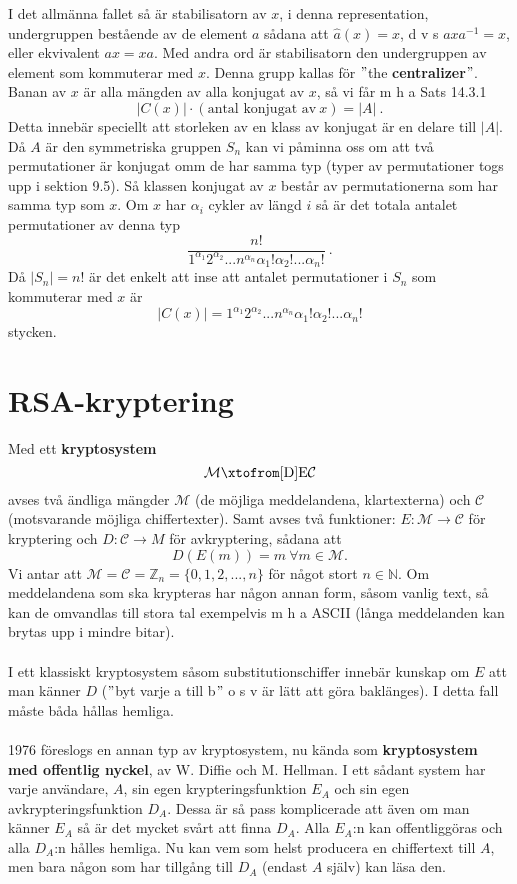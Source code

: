 \documentclass{article}
\begin{document}
I det allmänna fallet så är stabilisatorn av $x$, i denna representation, undergruppen bestående av de element $a$ sådana att $\hat{a}(x)=x$, d v s $axa^{-1}=x$, eller ekvivalent $ax=xa$. Med andra ord är stabilisatorn den undergruppen av element som kommuterar med $x$. Denna grupp kallas för $"$the \textbf{centralizer}$"$. Banan av $x$ är alla mängden av alla konjugat av $x$, så vi får m h a Sats 14.3.1
$$
|C(x)|\cdot(\textrm{antal konjugat av} \ x)=|A| \ .
$$
Detta innebär speciellt att storleken av en klass av konjugat är en delare till $|A|$. Då $A$ är den symmetriska gruppen $S_n$ kan vi påminna oss om att två permutationer är konjugat omm de har samma typ (typer av permutationer togs upp i sektion 9.5). Så klassen konjugat av $x$ består av permutationerna som har samma typ som $x$. Om $x$ har $\alpha_i$ cykler av längd $i$ så är det totala antalet permutationer av denna typ
$$
\frac{n!}{1^{\alpha_1}2^{\alpha_2}...n^{\alpha_n}\alpha_1!\alpha_2!...\alpha_n!} \ .
$$
Då $|S_n|=n!$ är det enkelt att inse att antalet permutationer i $S_n$ som kommuterar med $x$ är 
$$
|C(x)|=1^{\alpha_1}2^{\alpha_2}...n^{\alpha_n}\alpha_1!\alpha_2!...\alpha_n!
$$
stycken.
\newpage

\section{RSA-kryptering}
Med ett \textbf{kryptosystem}
$$
\mathcal{M}\xtofrom[\text{D}]{\text{E}}\mathcal{C}
$$
avses två ändliga mängder $\mathcal{M}$ (de möjliga meddelandena, klartexterna) och $\mathcal{C}$ (motsvarande möjliga chiffertexter). Samt avses två funktioner: $E:\mathcal{M}\rightarrow\mathcal{C}$ för kryptering och $D:\mathcal{C}\rightarrow{M}$ för avkryptering, sådana att
$$
D(E(m))=m \ \forall m\in\mathcal{M}.
$$
Vi antar att $\mathcal{M}=\mathcal{C}=\mathbb{Z}_n=\{0,1,2,...,n\}$ för något stort $n\in\mathbb{N}$. Om meddelandena som ska krypteras har någon annan form, såsom vanlig text, så kan de omvandlas till stora tal exempelvis m h a ASCII (långa meddelanden kan brytas upp i mindre bitar).
\\ \\
I ett klassiskt kryptosystem såsom substitutionschiffer innebär kunskap om $E$ att man känner $D$ ($"$byt varje a till b$"$ o s v är lätt att göra baklänges). I detta fall måste båda hållas hemliga.
\\ \\
1976 föreslogs en annan typ av kryptosystem, nu kända som \textbf{kryptosystem med offentlig nyckel}, av W. Diffie och M. Hellman. I ett sådant system har varje användare, $A$, sin egen krypteringsfunktion $E_A$ och sin egen avkrypteringsfunktion $D_A$. Dessa är så pass komplicerade att även om man känner $E_A$ så är det mycket svårt att finna $D_A$. Alla $E_A$:n kan offentliggöras och alla $D_A$:n hålles hemliga. Nu kan vem som helst producera en chiffertext till $A$, men bara någon som har tillgång till $D_A$ (endast $A$ själv) kan läsa den.
\end{document}
